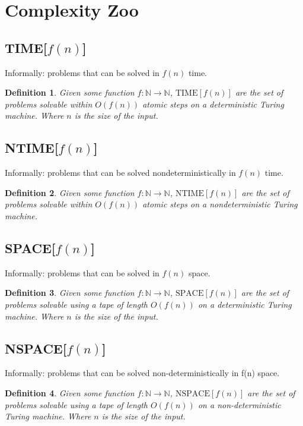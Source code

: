 \documentclass[]{article}
\theoremstyle{break}
\theoremstyle{break}
\newtheorem{definition}{Definition}[section]
\begin{document}
	
\section{Complexity Zoo}

\subsection{TIME[$f(n)$]}
\label{sec:TIME}
Informally: problems that can be solved in $f(n)$ time. 
\begin{definition}
	Given some function $f : \mathbb{N} \to \mathbb{N}$, $\text{TIME}[f(n)]$ are the set of problems solvable within $O(f(n))$ atomic steps on a deterministic Turing machine. Where $n$ is the size of the input.
\end{definition}

\subsection{NTIME[$f(n)$]}
\label{sec:NTIME}
Informally: problems that can be solved nondeterministically in $f(n)$ time. 
\begin{definition}
	Given some function $f : \mathbb{N} \to \mathbb{N}$, $\text{NTIME}[f(n)]$ are the set of problems solvable within $O(f(n))$ atomic steps on a nondeterministic Turing machine.
\end{definition}

\subsection{SPACE[$f(n)$]}
\label{sec:SPACE}
Informally: problems that can be solved in $f(n)$ space. 
\begin{definition}
	Given some function $f : \mathbb{N} \to \mathbb{N}$, $\text{SPACE}[f(n)]$ are the set of problems solvable using a tape of length $O(f(n))$ on a deterministic Turing machine. Where $n$ is the size of the input.
\end{definition}

\subsection{NSPACE[$f(n)$]}
\label{sec:NSPACE}
Informally: problems that can be solved non-deterministically in f(n) space. 
\begin{definition}
	Given some function $f : \mathbb{N} \to \mathbb{N}$, $\text{NSPACE}[f(n)]$ are the set of problems solvable using a tape of length $O(f(n))$ on a non-deterministic Turing machine. Where $n$ is the size of the input.
\end{definition}
\end{document}
